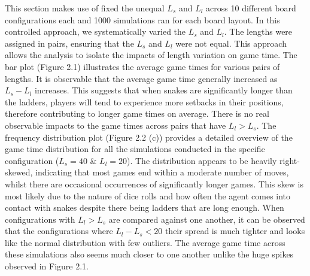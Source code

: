 \documentclass[12pt]{report}
\begin{document}
	This section makes use of fixed the unequal $L_{s}$ and $L_{l}$ across 10 different board configurations each and 1000 simulations ran for each board layout. In this controlled approach, we systematically varied the $L_{s}$ and $L_{l}$. The lengths were assigned in pairs, ensuring that the $L_{s}$ and $L_{l}$ were not equal. This approach allows the analysis to isolate the impacts of length variation on game time. The bar plot (Figure 2.1) illustrates the average game times for various pairs of lengths. It is observable that the average game time generally increased as $L_s - L_l$ increases. This suggests that when snakes are significantly longer than the ladders, players will tend to experience more setbacks in their positions, therefore contributing to longer game times on average. There is no real observable impacts to the game times across pairs that have $L_l > L_s$. The frequency distribution plot (Figure 2.2 (c)) provides a detailed overview of the game time distribution for all the simulations conducted in the specific configuration ($L_s=40$ \& $L_l=20$). The distribution appears to be heavily right-skewed, indicating that most games end within a moderate number of moves, whilst there are occasional occurrences of significantly longer games. This skew is most likely due to the nature of dice rolls and how often the agent comes into contact with snakes despite there being ladders that are long enough. When configurations with $L_l > L_s$ are compared against one another, it can be observed that the configurations where $L_l - L_s < 20$ their spread is much tighter and looks like the normal distribution with few outliers. The average game time across these simulations also seems much closer to one another unlike the huge spikes observed in Figure 2.1.
\end{document}
